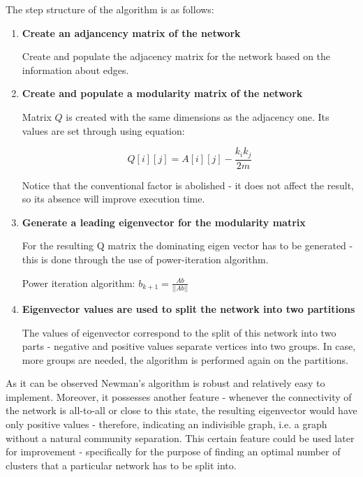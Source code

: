 The step structure of the algorithm is as follows:

\begin{enumerate}
\item{\textbf{Create an adjancency matrix of the network}}

Create and populate the adjacency matrix for the network based on the information about edges.

\item{\textbf{Create and populate a modularity matrix of the network}}

Matrix $Q$ is created with the same dimensions as the adjacency one. Its values are set through using equation:

\begin{equation}Q[i][j] = A[i][j] - \frac{k_{i}k_{j}}{2m}\end{equation}

Notice that the conventional factor is abolished - it does not affect the result, so its absence will improve execution time.

\item{\textbf{Generate a leading eigenvector for the modularity matrix}}

For the resulting Q matrix the dominating eigen vector has to be generated - this is done through the use of power-iteration algorithm\cite{VonMises1929}.

Power iteration algorithm: $b_{k+1} = \frac{Ab}{||Ab||}$

\item{\textbf{Eigenvector values are used to split the network into two partitions}}

The values of eigenvector correspond to the split of this network into two parts - negative and positive values separate vertices into two groups. In case, more groups are needed, the algorithm is performed again on the partitions.

\end{enumerate}

As it can be observed Newman's algorithm is robust and relatively easy to implement. Moreover, it possesses another feature - whenever the connectivity of the network is all-to-all or close to this state, the resulting eigenvector would have only positive values - therefore, indicating an indivisible graph, i.e. a graph without a natural community separation. This certain feature could be used later for improvement - specifically for the purpose of finding an optimal number of clusters that a particular network has to be split into.

